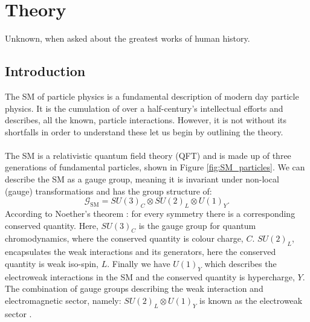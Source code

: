 \chapter{Theory}
\label{chap::Theory}

%
{Unknown, when asked about the greatest works of human history.}

\section{Introduction}
The SM of particle physics is a fundamental description of modern day particle physics. It is the cumulation of over a half-century's  intellectual efforts and describes, all the known, particle interactions. However, it is not without its shortfalls in order to understand these let us begin by outlining the theory.
\\
\\
The SM is a relativistic quantum field theory (QFT) and is made up of three generations of fundamental particles, shown in Figure \ref{fig:SM_particles}. We can describe the SM as a gauge group, meaning it is invariant under non-local (gauge) transformations and has the group structure of:
\begin{equation}
        \mathcal{G}_\text{SM} = SU(3)_C \otimes SU(2)_L \otimes U(1)_Y.
\end{equation}
According to Noether's theorem \cite{Noether_1971}: for every symmetry there is a corresponding conserved quantity. Here, $SU(3)_C$ is the gauge group for quantum chromodynamics, where the conserved quantity is colour charge, $C$. $SU(2)_L$, encapsulates the weak interactions and its generators, here the conserved quantity is weak iso-spin, $L$. Finally we have $U(1)_Y$ which describes the electroweak interactions in the SM and the conserved quantity is hypercharge, $Y$. The combination of gauge groups describing the weak interaction and electromagnetic sector, namely: $SU(2)_L \otimes U(1)_Y$ is known as the electroweak sector \cite{EW-uni-1,EW-uni-2,EW-uni-3,EW-uni-4}. 

